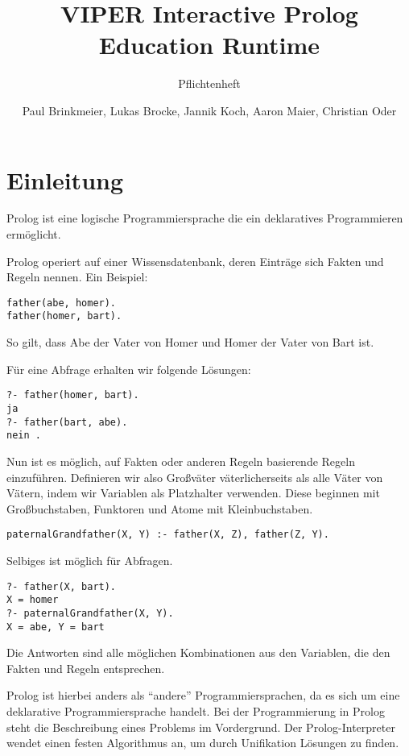 \documentclass[parskip=full,11pt,twoside]{scrartcl}
\title{VIPER Interactive Prolog Education Runtime}
\subtitle{Pflichtenheft}
\author{Paul Brinkmeier, Lukas Brocke, Jannik Koch, Aaron Maier, Christian Oder}
\begin{document}
\maketitle

\section{Einleitung}

Prolog ist eine logische Programmiersprache die ein deklaratives Programmieren ermöglicht.

Prolog operiert auf einer Wissensdatenbank, deren Einträge sich Fakten und Regeln nennen. Ein Beispiel:

\begin{lstlisting}
father(abe, homer).
father(homer, bart).
\end{lstlisting}

So gilt, dass Abe der Vater von Homer und Homer der Vater von Bart ist.

Für eine Abfrage erhalten wir folgende Lösungen:

\begin{lstlisting}
?- father(homer, bart).
ja
?- father(bart, abe).
nein .
\end{lstlisting}

Nun ist es möglich, auf Fakten oder anderen Regeln basierende Regeln einzuführen. Definieren wir also Großväter väterlicherseits als alle Väter von Vätern, indem wir Variablen als Platzhalter verwenden. Diese beginnen mit Großbuchstaben, Funktoren und Atome mit Kleinbuchstaben.

\begin{lstlisting}
paternalGrandfather(X, Y) :- father(X, Z), father(Z, Y).
\end{lstlisting}

Selbiges ist möglich für Abfragen.

\begin{lstlisting}
?- father(X, bart).
X = homer
?- paternalGrandfather(X, Y).
X = abe, Y = bart
\end{lstlisting}

Die Antworten sind alle möglichen Kombinationen aus den Variablen, die den Fakten und Regeln entsprechen.

Prolog ist hierbei anders als \enquote{andere} Programmiersprachen, da es sich um eine deklarative Programmiersprache handelt. Bei der Programmierung in Prolog steht die Beschreibung eines Problems im Vordergrund. Der Prolog-Interpreter wendet einen festen Algorithmus an, um durch Unifikation Lösungen zu finden.
\end{document}
